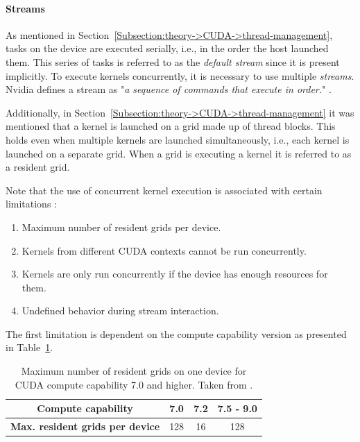 \paragraph{Streams} As mentioned in Section~\ref{Subsection:theory->CUDA->thread-management}, tasks on the device are executed serially, i.e., in the order the host launched them.
This series of tasks is referred to as the \textit{default stream} since it is present implicitly.
To execute kernels concurrently, it is necessary to use multiple \textit{streams}.
Nvidia defines a stream as "\textit{a sequence of commands that execute in order.}" \cite{NVIDIADecember2022}.

Additionally, in Section~\ref{Subsection:theory->CUDA->thread-management} it was mentioned that a kernel is launched on a grid made up of thread blocks.
This holds even when multiple kernels are launched simultaneously, i.e., each kernel is launched on a separate grid.
When a grid is executing a kernel it is referred to as a resident grid.

Note that the use of concurrent kernel execution is associated with certain limitations \cite{Cejka2022, NVIDIADecember2022}:

\begin{enumerate}
	\item Maximum number of resident grids per device.
	\item Kernels from different CUDA contexts cannot be run concurrently.
	\item Kernels are only run concurrently if the device has enough resources for them.
	\item Undefined behavior during stream interaction.
\end{enumerate}

The first limitation is dependent on the compute capability version as presented in Table~\ref{Table:theory->CUDA->concurrent-kernel-execution->maximum-resident-grids-per-device}.

\begin{table}[ht!]
	\centering
	\begin{tabular}{|c|c|c|c|}
		\hline
		\cellcolor[HTML]{C0C0C0}\textbf{Compute capability}             & 7.0 & 7.2 & 7.5 - 9.0 \\ \hline
		\cellcolor[HTML]{C0C0C0}\textbf{Max. resident grids per device} & 128 & 16  &    128    \\ \hline
	\end{tabular}
	\caption{Maximum number of resident grids on one device for CUDA compute capability 7.0 and higher.
		Taken from  \cite{NVIDIADecember2022}.
	}
	\label{Table:theory->CUDA->concurrent-kernel-execution->maximum-resident-grids-per-device}
\end{table}

